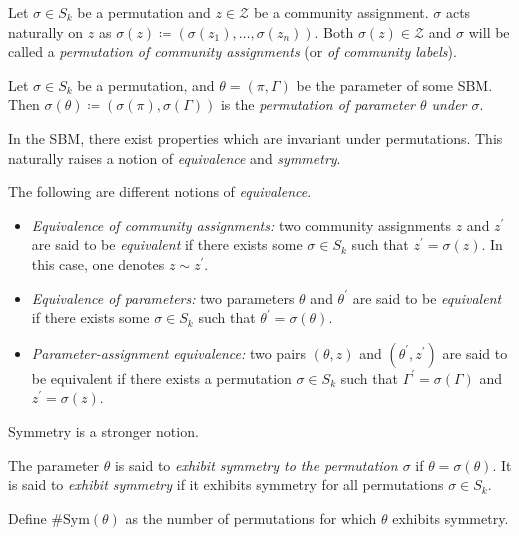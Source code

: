 \documentclass[../../main.tex]{subfiles} %
\begin{document}
\begin{definition}
	Let \(\sigma \in S_k\) be a permutation and \(z \in \mathcal Z\) be a 
	community assignment. \(\sigma\) acts naturally on \(z\) as \(\sigma(z) 
	\coloneqq 
	(\sigma(z_1), \dots, \sigma(z_n))\). Both \(\sigma(z) \in \mathcal Z\) and 
	\(\sigma\) will be called a \textit{permutation of 
		community assignments} (or \textit{of community labels}).
\end{definition}

\begin{definition}
	Let \(\sigma \in S_k\) be a permutation, and \(\theta = (\pi, \Gamma)\) be 
	the parameter of some SBM. Then \(\sigma(\theta) \coloneqq (\sigma(\pi), 
	\sigma(\Gamma))\) is the \textit{permutation of parameter \(\theta\) under 
		\(\sigma\)}.
\end{definition}

In the SBM, there exist properties which are invariant under 
permutations. This naturally raises a notion of \textit{equivalence} and 
\textit{symmetry}.

\begin{definition}[Equivalences]
	The following are different notions of \textit{equivalence}.
	\begin{itemize}
		\item \textit{Equivalence of community assignments:} two community 
		assignments \(z\) and 
		\(z^\prime\) are said to be \textit{equivalent} if there exists some 
		\(\sigma \in S_k\) such that \(z^\prime = \sigma(z)\). In this case, one 
		denotes \(z \sim z^\prime\).
		\item \textit{Equivalence of parameters:} two parameters \(\theta\) and 
		\(\theta^\prime\) are said to be \textit{equivalent} if there exists some 
		\(\sigma \in S_k\) such that \(\theta^\prime = \sigma(\theta)\).
		\item \textit{Parameter-assignment equivalence:} two pairs \((\theta, z)\) 
		and \((\theta^\prime, z^\prime)\) are said to be equivalent if there exists 
		a permutation \(\sigma \in S_k\) such that \(\Gamma^\prime = 
		\sigma(\Gamma)\) and \(z^\prime = \sigma(z)\).
	\end{itemize}
	\label{def:equivalences}
\end{definition}

Symmetry is a stronger notion.

\begin{definition}
	The parameter \(\theta\) is said to \textit{exhibit symmetry to the 
		permutation \(\sigma\)} if \(\theta = \sigma(\theta)\). It is said to 
	\textit{exhibit symmetry} if it exhibits symmetry for all permutations 
	\(\sigma \in S_k\).
\end{definition}
\begin{notation}
	Define \(\text{\#Sym}(\theta)\) as the number of permutations for which 
	\(\theta\) exhibits symmetry.
\end{notation}
\end{document}
